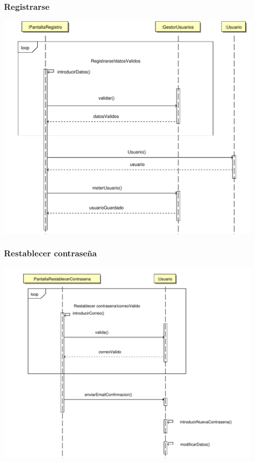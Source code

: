 \documentclass[11pt, a4paper, twoside, titlepage]{article}
\begin{document}
			\subsubsection{Registrarse}
				\begin{center}
					\includegraphics[scale=.5]{diseno/diagramas/registrarse.pdf}
				\end{center}

			\subsubsection{Restablecer contraseña}
				\begin{center}
					\includegraphics[scale=.6]{diseno/diagramas/restablecercontrasena.pdf}
				\end{center}
\end{document}
